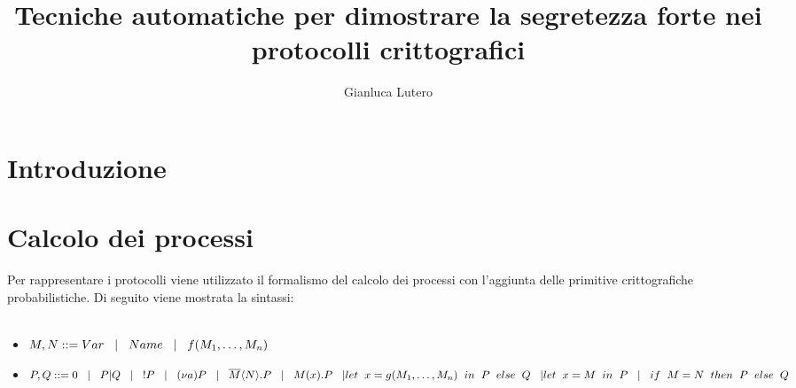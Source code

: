 \documentclass[12pt]{report}
\title{Tecniche automatiche per dimostrare la segretezza forte nei protocolli crittografici}
\author{Gianluca Lutero}
\begin{document}
\maketitle
\newpage
\tableofcontents

\newpage
{}
\section*{Introduzione}
\section*{Calcolo dei processi}
Per rappresentare i protocolli viene utilizzato il formalismo del calcolo dei processi con l'aggiunta delle primitive crittografiche probabilistiche. Di seguito viene mostrata la sintassi:\\
\\
\begin{itemize}
    \item $M, N ::= Var \hspace{3mm}|\hspace{3mm} Name \hspace{3mm}|\hspace{3mm} f(M_1, \dots ,M_n)$
    
    \item $P,Q ::= 0 \hspace{3mm}|\hspace{3mm} P|Q \hspace{3mm}|\hspace{3mm} !P \hspace{3mm}|\hspace{3mm} (\nu a)P \hspace{3mm}|\hspace{3mm} \overline{M} \langle N \rangle .P \hspace{3mm}|\hspace{3mm} M(x).P \hspace{3mm}|\hspace{3mm}\\let\hspace{2mm}x = g(M_1, \dots,M_n)\hspace{2mm} in\hspace{2mm}P\hspace{2mm} else\hspace{2mm} Q \hspace{3mm}| \\ let \hspace{2mm}x=M\hspace{2mm}in\hspace{2mm}P\hspace{3mm}|\hspace{3mm}if\hspace{2mm}M=N\hspace{2mm}then\hspace{2mm}P\hspace{2mm}else\hspace{2mm}Q$
\end{itemize}
\end{document}
